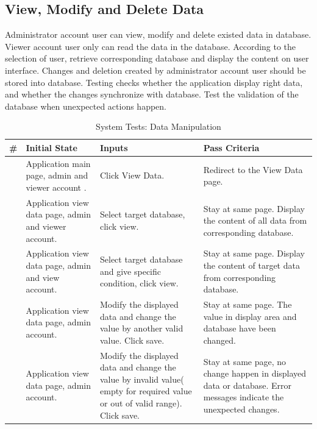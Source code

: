 \documentclass[12pt]{article}
\newcounter{TestCounter}
\begin{document}
\subsection{View, Modify and Delete Data} 
Administrator account user can view, modify and delete existed data in database. Viewer account user only can read the data in the database.  According to the selection of user, retrieve corresponding database and display the content on user interface. Changes and deletion created by administrator account user should be stored into database. Testing checks whether the application display right data, and  whether the changes synchronize with database. Test the validation of the database when unexpected actions happen.
\begin{center}
	\begin{longtable}{c>{\raggedright\arraybackslash}p{4.8cm} >{\raggedright\arraybackslash}p{3cm}>{\raggedright\arraybackslash}p{3cm}}
		\caption{System Tests: Data Manipulation}\label{DataManipulation_SystemTests}\\
		\toprule
		\bf \# & \bf Initial State & \bf Inputs & \bf Pass Criteria \\\midrule
		\stepcounter{TestCounter}\arabic{TestCounter} 
		& Application main page, admin and viewer account .
		& Click View Data.
		& Redirect to the View Data page.
		\\\midrule
		\stepcounter{TestCounter}\arabic{TestCounter} 
		& Application view data page, admin and viewer account.
		& Select target database, click view.
		& Stay at same page. Display the content of all data from corresponding database.
		\\\midrule
		\stepcounter{TestCounter}\arabic{TestCounter} 
		& Application view data page, admin and view account.
		& Select target database and give specific condition, click view. 
		& Stay at same page. Display the content of target data from corresponding database.
		\\\midrule
		\stepcounter{TestCounter}\arabic{TestCounter} 
		& Application view data page, admin account.
		& Modify the displayed data and change the value by another valid value. Click save.
		& Stay at same page. The value in display area and database have been changed.
		\\\midrule
		\stepcounter{TestCounter}\arabic{TestCounter} 
		& Application view data page, admin account.
		& Modify the displayed data and change the value by invalid value( empty for required value or out of valid range). Click save.
		& Stay at same page, no change happen in displayed data or database. Error messages indicate the unexpected changes.

\end{longtable}
\end{center}
\end{document}
